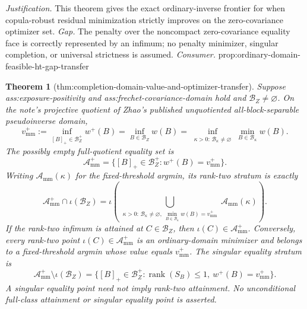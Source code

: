 \documentclass{article}
\newtheorem{theorem}{Theorem}
\begin{document}
\par\smallskip\noindent \textit{Justification.} This theorem gives the exact ordinary-inverse frontier for when copula-robust residual minimization strictly improves on the zero-covariance optimizer set. \textit{Gap.} The penalty over the noncompact zero-covariance equality face is correctly represented by an infimum; no penalty minimizer, singular completion, or universal strictness is assumed. \textit{Consumer.} prop:ordinary-domain-feasible-ht-gap-transfer

\begin{theorem}[thm:completion-domain-value-and-optimizer-transfer]\label{thm:completion-domain-value-and-optimizer-transfer}
Suppose ass:exposure-positivity and ass:frechet-covariance-domain hold and \(\mathcal B_Z\ne\varnothing\).  On the note's projective quotient of Zhao's published unquotiented all-block-separable pseudoinverse domain,
\[
v_{\mathrm{mm}}^+
:=\inf_{[B]_+\in\mathcal B_Z^+}w^+(B)
=\inf_{B\in\mathcal B_Z}w(B)
=\inf_{\substack{\kappa>0:\,\mathcal B_\kappa\ne\varnothing}}
\min_{B\in\mathcal B_\kappa}w(B).
\]
The possibly empty full-quotient equality set is
\[
\mathcal A_{\mathrm{mm}}^+
=\{[B]_+\in\mathcal B_Z^+:w^+(B)=v_{\mathrm{mm}}^+\}.
\]
Writing \(\mathcal A_{\mathrm{mm}}(\kappa)\) for the fixed-threshold argmin, its rank-two stratum is exactly
\[
\mathcal A_{\mathrm{mm}}^+\cap\iota(\mathcal B_Z)
=\iota\!\left(
\bigcup_{\substack{\kappa>0:\,
\mathcal B_\kappa\ne\varnothing,\ 
\min_{B\in\mathcal B_\kappa}w(B)=v_{\mathrm{mm}}^+}}
\mathcal A_{\mathrm{mm}}(\kappa)\right).
\]
If the rank-two infimum is attained at \(C\in\mathcal B_Z\), then \(\iota(C)\in\mathcal A_{\mathrm{mm}}^+\).  Conversely, every rank-two point \(\iota(C)\in\mathcal A_{\mathrm{mm}}^+\) is an ordinary-domain minimizer and belongs to a fixed-threshold argmin whose value equals \(v_{\mathrm{mm}}^+\).  The singular equality stratum is
\[
\mathcal A_{\mathrm{mm}}^+\setminus\iota(\mathcal B_Z)
=\{[B]_+\in\mathcal B_Z^+:\operatorname{rank}(S_B)\le1,\ w^+(B)=v_{\mathrm{mm}}^+\}.
\]
A singular equality point need not imply rank-two attainment.  No unconditional full-class attainment or singular equality point is asserted.
\end{theorem}
\end{document}
